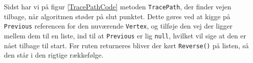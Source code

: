 Sidst har vi på figur \ref{TracePathCode} metoden \texttt{TracePath}, der finder vejen tilbage, når algoritmen støder på slut punktet. Dette gøres ved at kigge på \texttt{Previous} referencen for den nuværende \texttt{Vertex}, og tilføje den vej der ligger mellem dem til en liste, ind til at \texttt{Previous} er lig \texttt{null}, hvilket vil sige at den er nået tilbage til start. Før ruten returneres bliver der kørt \texttt{Reverse()} på listen, så den står i den rigtige rækkefølge.